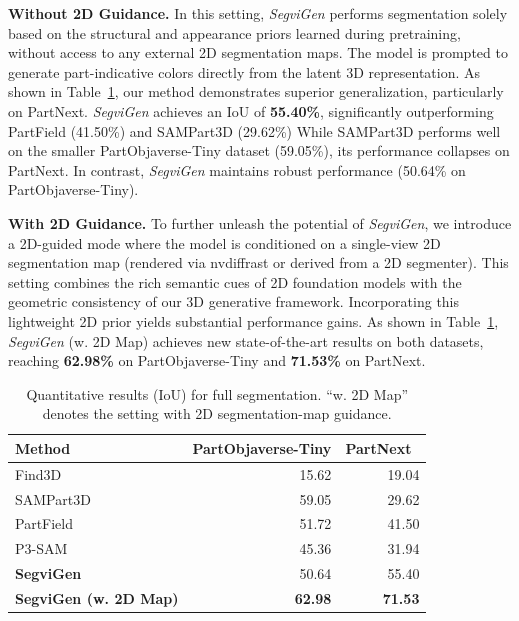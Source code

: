 \noindent \textbf{Without 2D Guidance.}
In this setting, \textit{SegviGen} performs segmentation solely based on the structural and appearance priors learned during pretraining, without access to any external 2D segmentation maps. The model is prompted to generate part-indicative colors directly from the latent 3D representation.
As shown in Table~\ref{tab:auto_segmentation}, our method demonstrates superior generalization, particularly on PartNext. \textit{SegviGen} achieves an IoU of \textbf{55.40\%}, significantly outperforming PartField (41.50\%) and SAMPart3D (29.62\%)
While SAMPart3D performs well on the smaller PartObjaverse-Tiny dataset (59.05\%), its performance collapses on PartNext. In contrast, \textit{SegviGen} maintains robust performance (50.64\% on PartObjaverse-Tiny).

\noindent \textbf{With 2D Guidance.}
To further unleash the potential of \textit{SegviGen}, we introduce a 2D-guided mode where the model is conditioned on a single-view 2D segmentation map (rendered via nvdiffrast or derived from a 2D segmenter). This setting combines the rich semantic cues of 2D foundation models with the geometric consistency of our 3D generative framework.
Incorporating this lightweight 2D prior yields substantial performance gains. As shown in Table~\ref{tab:auto_segmentation}, \textit{SegviGen} (w. 2D Map) achieves new state-of-the-art results on both datasets, reaching \textbf{62.98\%} on PartObjaverse-Tiny and \textbf{71.53\%} on PartNext.



\begin{table}[t]
\small
  \centering
  \caption{Quantitative results (IoU) for full segmentation. “w. 2D Map” denotes the setting with 2D segmentation-map guidance.}
  \label{tab:auto_segmentation}
  \begin{tabular}{l|rr}
    \toprule
    Method & PartObjaverse-Tiny & PartNext~ \\
    \midrule
    Find3D~\cite{find3d}            & 15.62 & 19.04 \\
    SAMPart3D~\cite{sampart3d}        & 59.05 & 29.62 \\
    PartField~\cite{partfield}       & 51.72 & 41.50 \\
    P3-SAM~\cite{p3sam}            & 45.36 & 31.94 \\
    \hline
    \textbf{SegviGen} & 50.64 & 55.40 \\
    \textbf{SegviGen (w. 2D Map)} & \textbf{62.98} & \textbf{71.53} \\
    \bottomrule
  \end{tabular}
\end{table}


